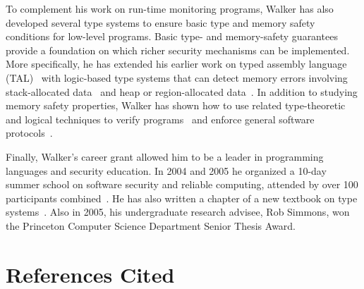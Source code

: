 \documentclass[11pt]{article}
\begin{document}
To complement his work on run-time monitoring programs, Walker has also
developed several type systems to ensure basic type and memory safety conditions
for low-level programs.  Basic type- and memory-safety guarantees provide a foundation on which
richer security mechanisms can be implemented.  More specifically, he
has extended his earlier work on typed assembly language (TAL)~\cite{morrisett+:tal,morrisett+:journal-stal} with
logic-based type systems that can detect memory errors involving
stack-allocated data~\cite{ahmed+:stack,jia+:stack} and heap or region-allocated
data~\cite{ahmed+:hierarchical-storage}.  In addition to studying memory safety
properties, Walker has shown how to use related type-theoretic and logical techniques
to verify programs~\cite{jia+:ilc} and enforce general software
protocols~\cite{mandelbaum+:refinements}.  

Finally, Walker's career grant allowed him to be a leader in
programming languages and security education. In 2004 and 2005 he organized
a 10-day summer school on software security and reliable computing,
attended by over 100 participants combined~\cite{summerschool04,summerschool05}.  He has also written a
chapter of a new textbook on type systems~\cite{walker:attapl}.  Also in 2005, his
undergraduate research advisee, Rob Simmons, won the Princeton Computer Science Department
Senior Thesis Award.



\newpage
\section{References Cited}

{

}
\end{document}
